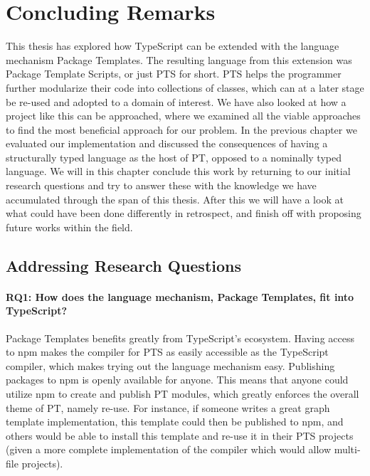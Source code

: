 \chapter{Concluding Remarks}\label{ch:results}

This thesis has explored how TypeScript can be extended with the language mechanism Package Templates.
The resulting language from this extension was Package Template Scripts, or just PTS for short.
PTS helps the programmer further modularize their code into collections of classes, which can at a later stage be re-used and adopted to a domain of interest.
We have also looked at how a project like this can be approached, where we examined all the viable approaches to find the most beneficial approach for our problem.
In the previous chapter we evaluated our implementation and discussed the consequences of having a structurally typed language as the host of PT, opposed to a nominally typed language.
We will in this chapter conclude this work by returning to our initial research questions and try to answer these with the knowledge we have accumulated through the span of this thesis.
After this we will have a look at what could have been done differently in retrospect, and finish off with proposing future works within the field.


\section{Addressing Research Questions}\label{sec:adressing-research-questions}


\subsubsection{RQ1: How does the language mechanism, Package Templates, fit into TypeScript?}

Package Templates benefits greatly from TypeScript's ecosystem.
Having access to npm makes the compiler for PTS as easily accessible as the TypeScript compiler, which makes trying out the language mechanism easy.
Publishing packages to npm is openly available for anyone.
This means that anyone could utilize npm to create and publish PT modules, which greatly enforces the overall theme of PT, namely re-use.
For instance, if someone writes a great graph template implementation, this template could then be published to npm, and others would be able to install this template and re-use it in their PTS projects (given a more complete implementation of the compiler which would allow multi-file projects).

